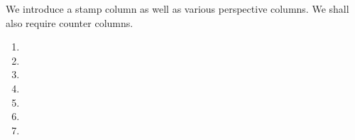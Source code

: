 We introduce a stamp column as well as various perspective columns.
We shall also require counter columns.
\begin{enumerate}
	\item \mxpStamp
	\item \mxpInstructionDecoder
	\item \mxpMacro
	\item \mxpScenario
	\item \mxpComputation
        \item \ct
        \item \ctMax
\end{enumerate}
